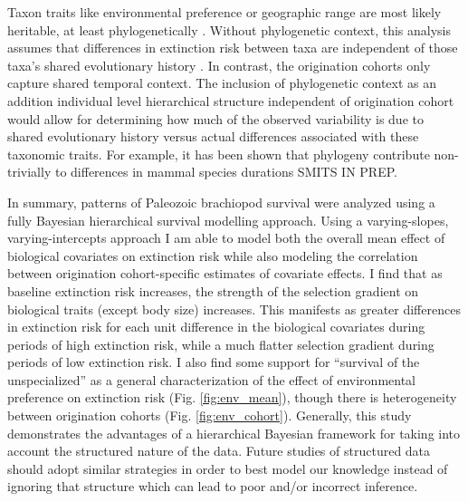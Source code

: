 \documentclass[12pt,letterpaper]{article}
\begin{document}
Taxon traits like environmental preference or geographic range \citep{Jablonski1987,Hunt2005b} are most likely heritable, at least phylogenetically \citep{Lynch1991,Housworth2004}. Without phylogenetic context, this analysis assumes that differences in extinction risk between taxa are independent of those taxa's shared evolutionary history \citep{Felsenstein1985b}. In contrast, the origination cohorts only capture shared temporal context. The inclusion of phylogenetic context as an addition individual level hierarchical structure independent of origination cohort would allow for determining how much of the observed variability is due to shared evolutionary history versus actual differences associated with these taxonomic traits. For example, it has been shown that phylogeny contribute non-trivially to differences in mammal species durations \uppercase{Smits in prep}.

In summary, patterns of Paleozoic brachiopod survival were analyzed using a fully Bayesian hierarchical survival modelling approach. Using a varying-slopes, varying-intercepts approach I am able to model both the overall mean effect of biological covariates on extinction risk while also modeling the correlation between origination cohort-specific estimates of covariate effects. I find that as baseline extinction risk increases, the strength of the selection gradient on biological traits (except body size) increases. This manifests as greater differences in extinction risk for each unit difference in the biological covariates during periods of high extinction risk, while a much flatter selection gradient during periods of low extinction risk. I also find some support for ``survival of the unspecialized'' \citep{Simpson1944,Liow2004a,Liow2007b,Nurnberg2013a,Nurnberg2015} as a general characterization of the effect of environmental preference on extinction risk (Fig. \ref{fig:env_mean}), though there is heterogeneity between origination cohorts (Fig. \ref{fig:env_cohort}). Generally, this study demonstrates the advantages of a hierarchical Bayesian framework for taking into account the structured nature of the data. Future studies of structured data should adopt similar strategies in order to best model our knowledge instead of ignoring that structure which can lead to poor and/or incorrect inference.
\end{document}
